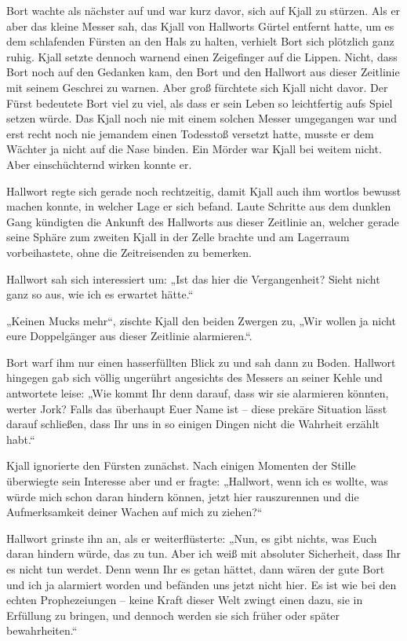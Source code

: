 Bort wachte als nächster auf und war kurz davor, sich auf Kjall zu stürzen. Als er aber das kleine Messer sah, das Kjall von Hallworts Gürtel entfernt hatte, um es dem schlafenden Fürsten an den Hals zu halten, verhielt Bort sich plötzlich ganz ruhig. Kjall setzte dennoch warnend einen Zeigefinger auf die Lippen. Nicht, dass Bort noch auf den Gedanken kam, den Bort und den Hallwort aus dieser Zeitlinie mit seinem Geschrei zu warnen. Aber groß fürchtete sich Kjall nicht davor. Der Fürst bedeutete Bort viel zu viel, als dass er sein Leben so leichtfertig aufs Spiel setzen würde. Das Kjall noch nie mit einem solchen Messer umgegangen war und erst recht noch nie jemandem einen Todesstoß versetzt hatte, musste er dem Wächter ja nicht auf die Nase binden. Ein Mörder war Kjall bei weitem nicht. Aber einschüchternd wirken konnte er.

Hallwort regte sich gerade noch rechtzeitig, damit Kjall auch ihm wortlos bewusst machen konnte, in welcher Lage er sich befand. Laute Schritte aus dem dunklen Gang kündigten die Ankunft des Hallworts aus dieser Zeitlinie an, welcher gerade seine Sphäre zum zweiten Kjall in der Zelle brachte und am Lagerraum vorbeihastete, ohne die Zeitreisenden zu bemerken.

Hallwort sah sich interessiert um: „Ist das hier die Vergangenheit? Sieht nicht ganz so aus, wie ich es erwartet hätte.“

„Keinen Mucks mehr“, zischte Kjall den beiden Zwergen zu, „Wir wollen ja nicht eure Doppelgänger aus dieser Zeitlinie alarmieren.“.

Bort warf ihm nur einen hasserfüllten Blick zu und sah dann zu Boden. Hallwort hingegen gab sich völlig ungerührt angesichts des Messers an seiner Kehle und antwortete leise: „Wie kommt Ihr denn darauf, dass wir sie alarmieren könnten, werter Jork? Falls das überhaupt Euer Name ist – diese prekäre Situation lässt darauf schließen, dass Ihr uns in so einigen Dingen nicht die Wahrheit erzählt habt.“

Kjall ignorierte den Fürsten zunächst. Nach einigen Momenten der Stille überwiegte sein Interesse aber und er fragte: „Hallwort, wenn ich es wollte, was würde mich schon daran hindern können, jetzt hier rauszurennen und die Aufmerksamkeit deiner Wachen auf mich zu ziehen?“

Hallwort grinste ihn an, als er weiterflüsterte: „Nun, es gibt nichts, was Euch daran hindern würde, das zu tun. Aber ich weiß mit absoluter Sicherheit, dass Ihr es nicht tun werdet. Denn wenn Ihr es getan hättet, dann wären der gute Bort und ich ja alarmiert worden und befänden uns jetzt nicht hier. Es ist wie bei den echten Prophezeiungen – keine Kraft dieser Welt zwingt einen dazu, sie in Erfüllung zu bringen, und dennoch werden sie sich früher oder später bewahrheiten.“

